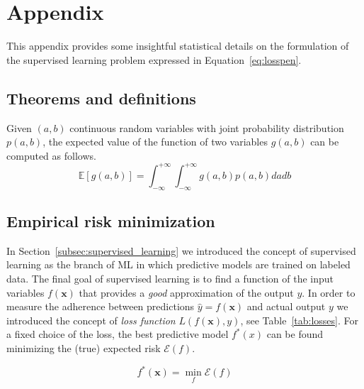 \appendix

\chapter{Appendix} \label{appendix:A}
This appendix provides some insightful statistical details on the formulation of the supervised learning problem expressed in Equation~\eqref{eq:losspen}.


\section{Theorems and definitions}

\begin{theorem} \label{th:lotus}
	Given $(a,b)$ continuous random variables with joint probability distribution $p(a,b)$, the expected value of the function of two variables $g(a,b)$ can be computed as follows.
	$$\mathbb{E}[g(a,b)]=\int_{-\infty}^{+\infty}\int_{-\infty}^{+\infty}g(a,b)p(a,b)dadb$$
\end{theorem}


\section{Empirical risk minimization} \label{sec:erm}
In Section~\ref{subsec:supervised_learning} we introduced the concept of supervised learning as the branch of ML in which predictive models are trained on labeled data. The final goal of supervised learning is to find a function of the input variables $f(\bm{x})$ that provides a \textit{good} approximation of the output $y$. In order to measure the adherence between predictions $\hat y = f(\bm{x})$ and actual output $y$ we introduced the concept of \textit{loss function} $L(f(\bm{x}), y)$, see Table~\ref{tab:losses}. For a fixed choice of the loss, the best predictive model $f^*(x)$ can be found minimizing the (true) expected risk $\mathcal{E}(f)$.

\begin{equation} \label{eq:fstar}
	f^*(\bm{x}) = \min_f{\mathcal{E}(f)}
\end{equation}

